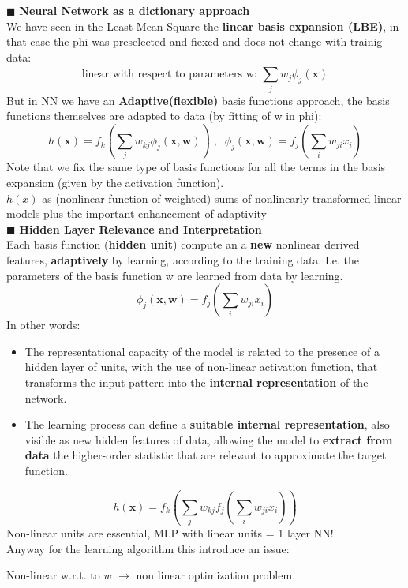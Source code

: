 \documentclass[../main.tex]{subfiles}
\begin{document}
\noindent$\blacksquare$ \textbf{Neural Network as a dictionary approach}\\
We have seen in the Least Mean Square the \textbf{linear basis expansion (LBE)}, in that case the phi was preselected and fiexed and does not change with trainig data:
$$ \text{linear with respect to parameters w: } \sum_{j}^{}w_j\phi_j(\mathbf{x})$$
But in NN we have an \textbf{Adaptive(flexible)} basis functions approach, the basis functions themselves are adapted to data (by fitting of w in phi):
$$ h(\mathbf{x}) = f_k\left(\sum_{j}^{}w_{kj}\phi_j(\mathbf{x,w})\right)\;,\;\;\phi_j(\mathbf{x,w}) = f_j\left( \sum_{i}^{}w_{ji}x_i \right)$$
Note that we fix the same type of basis functions for all the terms in the basis expansion (given by the activation function).\\


$h(x)$ as (nonlinear function of weighted) sums of nonlinearly transformed linear models plus the important enhancement of adaptivity\\

\noindent$\blacksquare$ \textbf{Hidden Layer Relevance and Interpretation}\\
Each basis function (\textbf{hidden unit}) compute an a \textbf{new} nonlinear derived features, \textbf{adaptively} by learning, according to the training data. I.e. the parameters of the basis function w are learned from data by learning.
$$\phi_j(\mathbf{x,w}) = f_j\left( \sum_{i}^{}w_{ji}x_i \right)$$
In other words:
\begin{itemize}
    \item The representational capacity of the model is related to the presence of a hidden layer of units, with the use of non-linear activation function, that transforms the input pattern into the \textbf{internal representation} of the network.
    
    \item The learning process can define a \textbf{suitable internal representation}, also visible as new hidden features of data, allowing the model to \textbf{extract from data} the higher-order statistic that are relevant to approximate the target function.
\end{itemize}
$$ h(\mathbf{x}) = f_k\left(\sum_{j}^{}w_{kj} f_j\left( \sum_{i}^{}w_{ji}x_i\right)\right)$$
Non-linear units are essential, MLP with linear units = 1 layer NN!\\

Anyway for the learning algorithm this introduce an issue:
\begin{center}
Non-linear w.r.t. to $w$ $\rightarrow$ non linear optimization problem.
\end{center}
\end{document}
